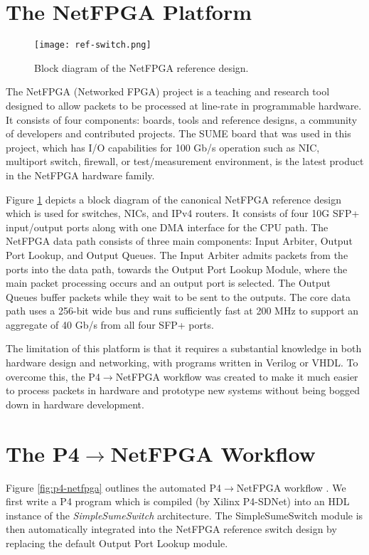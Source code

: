 \section{The NetFPGA Platform}
\begin{figure}[!h]
	\centering
	\texttt{[image: ref-switch.png]}
	\caption{Block diagram of the NetFPGA reference design.}
	\label{ref-switch}
\end{figure}

The NetFPGA (Networked FPGA) project is a teaching and research tool designed to allow packets to be processed at line-rate in programmable hardware. It consists of four components: boards, tools and reference designs, a community of developers and contributed projects. The SUME board that was used in this project, which has I/O capabilities for 100 Gb/s operation such as NIC, multiport switch, firewall, or test/measurement environment, is the latest product in the NetFPGA hardware family. 

Figure \ref{ref-switch} depicts a block diagram of the canonical NetFPGA reference design which is used for switches, NICs, and IPv4 routers. It consists of four 10G SFP+ input/output ports along with one DMA interface for the CPU path. The NetFPGA data path consists of three main components: Input Arbiter, Output Port Lookup, and Output Queues. The Input Arbiter admits packets from the ports into the data path, towards the Output Port Lookup Module, where the main packet processing occurs and an output port is selected. The Output Queues buffer packets while they wait to be sent to the outputs. The core data path uses a 256-bit wide bus and runs sufficiently fast at 200 MHz to support an aggregate of 40 Gb/s from all four SFP+ ports.

The limitation of this platform is that it requires a substantial knowledge in both hardware design and networking, with programs written in Verilog or VHDL. To overcome this, the P4$\rightarrow$NetFPGA workflow was created to make it much easier to process packets in hardware and prototype new systems without being bogged down in hardware development.

\section{The P4$\rightarrow$NetFPGA Workflow}
\label{sec:p4-netfpga}
Figure \ref{fig:p4-netfpga} outlines the automated P4$\rightarrow$NetFPGA workflow \cite{fpga19}. We first write a P4 program which is compiled (by Xilinx P4-SDNet) into an HDL instance of the \textit{SimpleSumeSwitch} architecture. The SimpleSumeSwitch module is then automatically integrated into the NetFPGA reference switch design by replacing the default Output Port Lookup module.

